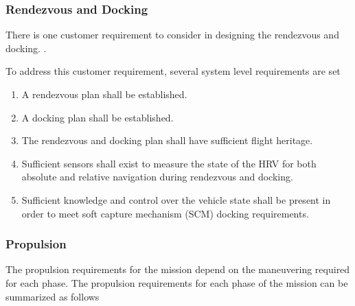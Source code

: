 \documentclass[paper=letter, fontsize=11pt]{scrartcl} %
\numberwithin{equation}{section} %
\numberwithin{figure}{section} %
\numberwithin{table}{section} %
\begin{document}
\subsubsection{Rendezvous and Docking}
There is one customer requirement to consider in designing the rendezvous and docking. .

To address this customer requirement, several system level requirements are set
\begin{enumerate}
\item A rendezvous plan shall be established.
\item A docking plan shall be established.
\item The rendezvous and docking plan shall have sufficient flight heritage.
\item Sufficient sensors shall exist to measure the state of the HRV for both absolute and relative navigation during rendezvous and docking.
\item Sufficient knowledge and control over the vehicle state shall be present in order to meet soft capture mechanism (SCM) docking requirements.
\end{enumerate}


\subsubsection{Propulsion}
The propulsion requirements for the mission depend on the maneuvering required for each phase. The propulsion requirements for each phase of the mission can be summarized as follows
\end{document}
